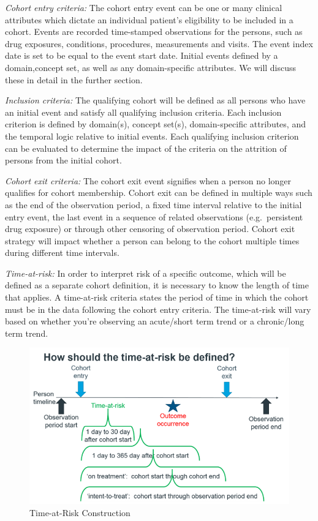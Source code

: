 \documentclass[11pt]{book}
\theoremstyle{definition}
\theoremstyle{definition}
\theoremstyle{definition}
\theoremstyle{remark}
\begin{document}
\emph{Cohort entry criteria:} The cohort entry event can be one or many clinical attributes which dictate an individual patient's eligibility to be included in a cohort. Events are recorded time-stamped observations for the persons, such as drug exposures, conditions, procedures, measurements and visits. The event index date is set to be equal to the event start date. Initial events defined by a domain,concept set, as well as any domain-specific attributes. We will discuss these in detail in the further section.

\emph{Inclusion criteria:} The qualifying cohort will be defined as all persons who have an initial event and satisfy all qualifying inclusion criteria. Each inclusion criterion is defined by domain(s), concept set(s), domain-specific attributes, and the temporal logic relative to initial events. Each qualifying inclusion criterion can be evaluated to determine the impact of the criteria on the attrition of persons from the initial cohort.

\emph{Cohort exit criteria:} The cohort exit event signifies when a person no longer qualifies for cohort membership. Cohort exit can be defined in multiple ways such as the end of the observation period, a fixed time interval relative to the initial entry event, the last event in a sequence of related observations (e.g.~persistent drug exposure) or through other censoring of observation period. Cohort exit strategy will impact whether a person can belong to the cohort multiple times during different time intervals.

\emph{Time-at-risk:} In order to interpret risk of a specific outcome, which will be defined as a separate cohort definition, it is necessary to know the length of time that applies. A time-at-risk criteria states the period of time in which the cohort must be in the data following the cohort entry criteria. The time-at-risk will vary based on whether you're observing an acute/short term trend or a chronic/long term trend.

\begin{figure}

{\centering \includegraphics[width=0.9\linewidth]{images/Cohorts/cohort-TAR} 

}

\caption{Time-at-Risk Construction}\label{fig:cohortTar}
\end{figure}
\end{document}
